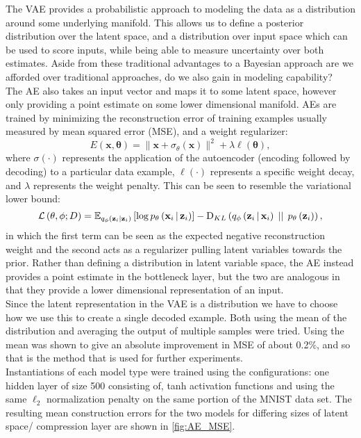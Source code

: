 \documentclass[../report.tex]{subfiles}
\begin{document}
The VAE provides a probabilistic approach to modeling the data as a distribution around some underlying manifold. This allows us to define a posterior distribution over the latent space, and a distribution over input space which can be used to score inputs, while being able to measure uncertainty over both estimates. Aside from these traditional advantages to a Bayesian approach are we afforded over traditional approaches, do we also gain in modeling capability?\\
The AE also takes an input vector and maps it to some latent space, however only providing a point estimate on some lower dimensional manifold. AEs are trained by minimizing the reconstruction error of training examples usually measured by mean squared error (MSE), and a weight regularizer:
\begin{equation}
E(\mathbf{x, \theta}) = \lVert \mathbf{x} + \sigma_\theta(\mathbf{x})\rVert^2 + \lambda \ell(\mathbf{\theta}),
\end{equation}
where $\sigma(\cdot)$ represents the application of the autoencoder (encoding followed by decoding) to a particular data example, $\ell(\cdot)$ represents a specific weight decay, and $\lambda$ represents the weight penalty. This can be seen to resemble the variational lower bound:
\begin{equation}
\mathcal{L} \left( \mathbf{\theta}, \phi; D\right)=\mathbb{E}_{q_\phi \left( \mathbf{z}_i|\mathbf{z}_i\right)} \left[ \log p_\mathbf{\theta} \left(\mathbf{x}_i \, \middle\vert \, \mathbf{z}_i \right) \right] - \textrm{D}_{KL} \left( q_\phi \left(\mathbf{z}_i \, \middle\vert \, \mathbf{x}_i \right) \, \mid \mid \, p_\mathbf{\theta} \left( \mathbf{z}_i\right)\right),
\end{equation}
in which the first term can be seen as the expected negative reconstruction weight and the second  acts as a regularizer pulling latent variables towards the prior. Rather than defining a distribution in latent variable space, the AE instead provides a point estimate in the bottleneck layer, but the two are analogous in that they provide a lower dimensional representation of an input.\\
Since the latent representation in the VAE is a distribution we have to choose how we use this to create a single decoded example. Both using the mean of the distribution and averaging the output of multiple samples were tried. Using the mean was shown to give an absolute improvement in MSE of about 0.2\%, and so that is the method that is used for further experiments.\\
Instantiations of each model type were trained using the configurations: one hidden layer of size 500 consisting of, tanh activation functions and using the same $\ell_2$ normalization penalty on the same portion of the MNIST data set. The resulting mean construction errors for the two models for differing sizes of latent space/ compression layer are shown in \cref{fig:AE_MSE}.
\end{document}
